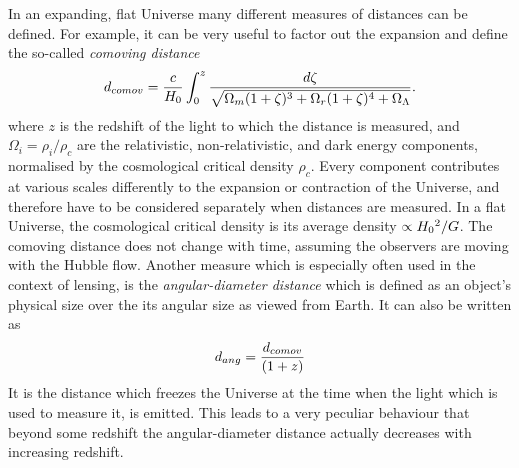In an expanding, flat Universe many different measures of distances can be
defined.  For example, it can be very useful to factor out the expansion and
define the so-called \textit{comoving distance}
%
\begin{equation}\eqlbl{d_comov}%
    d_{comov} = \frac{c}{\Ho} \int_0^{z} \frac{d\zeta}{\sqrt{\Omega_m(1+\zeta)^3
    + \Omega_r(1+\zeta)^4 + \Omega_\Lambda}}.
\end{equation}
%
where $z$ is the redshift of the light to which the distance is measured, and
$\Omega_i=\rho_i/\rho_c$ are the relativistic, non-relativistic, and dark energy
components, normalised by the cosmological critical density $\rho_c$.  Every
component contributes at various scales differently to the expansion or
contraction of the Universe, and therefore have to be considered separately when
distances are measured.  In a flat Universe, the cosmological critical density
is its average density $\propto H_{0}{}^{2}/G$.  The comoving distance does not change with time,
assuming the observers are moving with the Hubble flow.  Another measure which
is especially often used in the context of lensing, is the
\textit{angular-diameter distance} which is defined as an object's physical size
over the its angular size as viewed from Earth. It can also be written as
%
\begin{equation}\eqlbl{d_comov}%
    d_{ang} = \frac{d_{comov}}{(1+z)}
\end{equation}
%
It is the distance which freezes the Universe at the time when the light which
is used to measure it, is emitted.  This leads to a very peculiar behaviour that
beyond some redshift the angular-diameter distance actually decreases with
increasing redshift.

